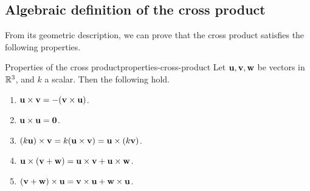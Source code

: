 \subsection{Algebraic definition of the cross product}

From its geometric description, we can prove that the cross product
satisfies the following properties.

\begin{proposition}{Properties of the cross product}{properties-cross-product}
  Let $\vect{u}, \vect{v}, \vect{w}$ be vectors in $\mathbb{R}^3$, and $k$ a
  scalar. Then the following hold.%
  \begin{enumerate}
  \item
    $\vect{u}\times \vect{v}= -(\vect{v}\times \vect{u})$.
  \item $\vect{u}\times \vect{u}=\vect{0}$.
  \item $(k \vect{u})\times \vect{v}= k (\vect{u}\times \vect{v})
    =\vect{u}\times (k \vect{v})$.
  \item $\vect{u}\times (\vect{v}+\vect{w}) =\vect{u}\times \vect{v}+\vect{u}\times \vect{w}$.
  \item $(\vect{v}+\vect{w}) \times \vect{u}=\vect{v} \times \vect{u}+\vect{w}\times \vect{u}$.
  \end{enumerate}
\end{proposition}

